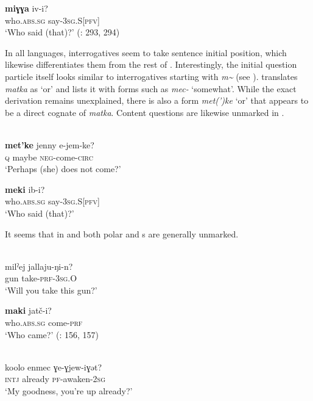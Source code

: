     \ex
    \gll \textbf{{miɣɣa}} iv-i?\\
    who.\textsc{abs}.\textsc{sg}  say-3\textsc{sg.}S[\textsc{pfv]}\\
    \glt ‘Who said (that)?’ (\citealt{Nagayama2011}: 293, 294)
    \z
    \z

\noindent In all  languages, interrogatives seem to take sentence initial position, which likewise differentiates them from the rest of . Interestingly, the initial question particle itself looks similar to  interrogatives starting with \textit{m{\textasciitilde}} (see ). \citet[416]{Fortescue2005} translates \textit{matka} as ‘or’ and lists it with forms such as  \textit{mec-} ‘somewhat’. While the exact derivation remains unexplained, there is also a  form \textit{met(’)ke} ‘or’ that appears to be a direct cognate of  \textit{matka}. Content questions are likewise unmarked in .

\ea%
    \label{ex:chuk:3}
    \ea {}\\
    \gll \textbf{{met’ke}} jenny  e-jem-ke?\\
    \textsc{q}    maybe  \textsc{neg}-come-\textsc{circ}\\
    \glt ‘Perhaps (she) does not come?’

    \ex
    \gll\textbf{{meki}} ib-i?\\
    who.\textsc{abs}.\textsc{sg}  say-3\textsc{sg.}S[\textsc{pfv]}\\
    \glt ‘Who said (that)?’ \citep[51]{Zhukova1997}
    \z
    \z

It seems that in  and  both polar and s are generally unmarked.

\ea%
    \label{ex:chuk:4}
    \\
    \ea
    \gll milˀej  jallaju-ŋi-n?\\
    gun  take-\textsc{prf}-3\textsc{sg}.O\\
    \glt ‘Will you take this gun?’

    \ex
    \gll\textbf{{maki}} jatč-i?\\
    who.\textsc{abs}.\textsc{sg}  come-\textsc{prf}\\
    \glt ‘Who came?’ (\citealt{Volodin2001}: 156, 157)
    \z
    \z

\ea%
    \label{ex:chuk:5}
    \\
    \ea
    \gll koolo  enmec    ɣe-ɣjew-iɣǝt?\\
    \textsc{intj}  already    \textsc{pf}-awaken-2\textsc{sg}\\
    \glt ‘My goodness, you’re up already?’

